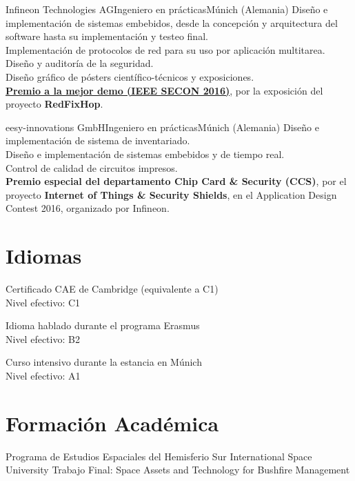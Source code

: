 \documentclass[11pt,a4paper,sans,spanish]{moderncv}
\begin{document}
{Infineon Technologies AG}{Ingeniero en prácticas}{Múnich (Alemania)}{}
{Diseño e implementación de sistemas embebidos, desde la concepción y arquitectura del software hasta su implementación y testeo final.\\
Implementación de protocolos de red para su uso por aplicación multitarea.\\
Diseño y auditoría de la seguridad.\\
Diseño gráfico de pósters científico-técnicos y exposiciones.\\
\href{http://secon2016.ieee-secon.org/content/demos-session}{\textbf{Premio a la mejor demo (IEEE SECON 2016)}}, por la exposición del proyecto \textbf{RedFixHop}.
}

{eesy-innovations GmbH}{Ingeniero en prácticas}{Múnich (Alemania)}{}
{Diseño e implementación de sistema de inventariado.\\
Diseño e implementación de sistemas embebidos y de tiempo real.\\
Control de calidad de circuitos impresos.\\
\textbf{Premio especial del departamento Chip Card \& Security (CCS)}, por el proyecto \textbf{Internet of Things \& Security Shields}, en el Application Design Contest 2016, organizado por Infineon.}


\section{Idiomas}


{Certificado CAE de Cambridge (equivalente a C1)\\Nivel efectivo: C1}

{Idioma hablado durante el programa Erasmus\\Nivel efectivo: B2}

{Curso intensivo durante la estancia en Múnich\\Nivel efectivo: A1}


\section{Formación Académica}

{Programa de Estudios Espaciales del Hemisferio Sur}
{International Space University}{}{}
{Trabajo Final:
Space Assets and Technology for Bushfire Management}
\end{document}
